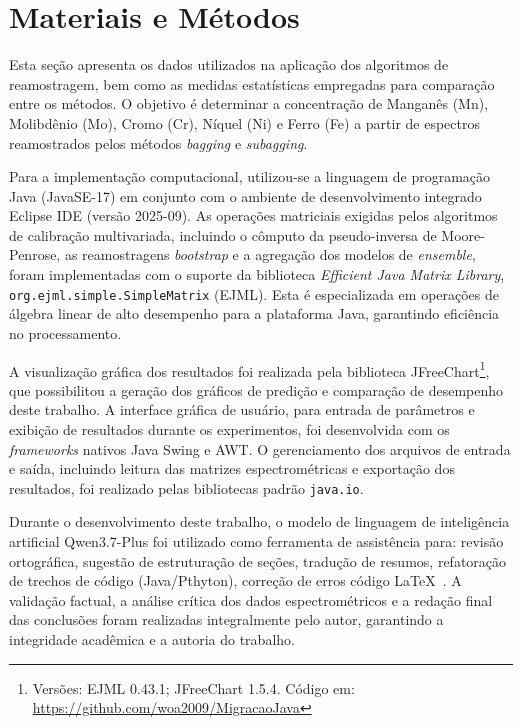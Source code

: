 \chapter{Materiais e Métodos}
\label{cha:metresult}

Esta seção apresenta os dados utilizados na aplicação dos algoritmos 
de reamostragem, bem como as medidas estatísticas empregadas para 
comparação entre os métodos. O objetivo é determinar a concentração 
de Manganês (Mn), Molibdênio (Mo), Cromo (Cr), Níquel (Ni) e Ferro 
(Fe) a partir de espectros reamostrados pelos métodos \textit{bagging} 
e \textit{subagging}.

Para a implementação computacional, utilizou-se a linguagem de programação Java (JavaSE-17) em conjunto com o ambiente de desenvolvimento integrado Eclipse IDE (versão 2025-09). As operações matriciais exigidas pelos algoritmos de calibração multivariada, incluindo o cômputo da pseudo-inversa de Moore-Penrose, as reamostragens \textit{bootstrap} e a agregação dos modelos de \textit{ensemble}, foram implementadas com o suporte da biblioteca \textit{Efficient Java Matrix Library}, \texttt{org.ejml.simple.SimpleMatrix} (EJML). Esta é especializada em operações de álgebra linear de alto desempenho para a plataforma Java, garantindo eficiência no processamento.

A visualização gráfica dos resultados foi realizada pela biblioteca JFreeChart\footnote{Versões: EJML 0.43.1; JFreeChart 1.5.4. Código em: \url{https://github.com/woa2009/MigracaoJava}}, que possibilitou a geração dos gráficos de predição e comparação de desempenho deste trabalho. A interface gráfica de usuário, para entrada de parâmetros e exibição de resultados durante os experimentos, foi desenvolvida com os \textit{frameworks} nativos Java Swing e AWT. O gerenciamento dos arquivos de entrada e saída, incluindo leitura das matrizes espectrométricas e exportação dos resultados, foi realizado pelas bibliotecas padrão \texttt{java.io}.


Durante o desenvolvimento deste trabalho, o modelo de linguagem de inteligência artificial Qwen3.7-Plus foi utilizado como ferramenta de assistência para: revisão ortográfica, sugestão de estruturação de seções, tradução de resumos, refatoração de trechos de código (Java/Pthyton), correção de erros código \LaTeX~\cite{ alibaba2026qwen}. A validação factual, a análise crítica dos dados espectrométricos e a redação final das conclusões foram realizadas integralmente pelo autor, garantindo a integridade acadêmica e a autoria do trabalho.

